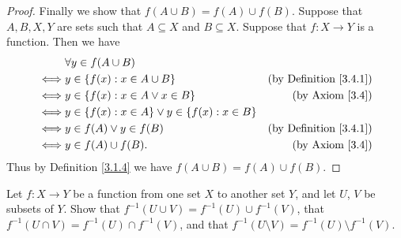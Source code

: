 \begin{proof}
    Finally we show that \(f(A \cup B) = f(A) \cup f(B)\).
    Suppose that \(A, B, X, Y\) are sets such that \(A \subseteq X\) and \(B \subseteq X\).
    Suppose that \(f : X \to Y\) is a function.
    Then we have
    \begin{align*}
             & \forall y \in f(A \cup B)                                                                   \\
        \iff & y \in \{f(x) : x \in A \cup B\}                        & \text{(by Definition \ref{3.4.1})} \\
        \iff & y \in \{f(x) : x \in A \lor x \in B\}                  & \text{(by Axiom \ref{3.4})}        \\
        \iff & y \in \{f(x) : x \in A\} \lor y \in \{f(x) : x \in B\}                                      \\
        \iff & y \in f(A) \lor y \in f(B)                             & \text{(by Definition \ref{3.4.1})} \\
        \iff & y \in f(A) \cup f(B).                                  & \text{(by Axiom \ref{3.4})}
    \end{align*}
    Thus by Definition \ref{3.1.4} we have \(f(A \cup B) = f(A) \cup f(B)\).
\end{proof}

\begin{exercise}\label{ex 3.4.4}
    Let \(f : X \to Y\) be a function from one set \(X\) to another set \(Y\), and let \(U\), \(V\) be subsets of \(Y\). Show that \(f^{-1}(U \cup V) = f^{-1}(U) \cup f^{-1}(V)\), that
    \(f^{-1}(U \cap V) = f^{-1}(U) \cap f^{-1}(V)\), and that \(f^{-1}(U \setminus V) = f^{-1}(U) \setminus f^{-1}(V)\).
\end{exercise}

